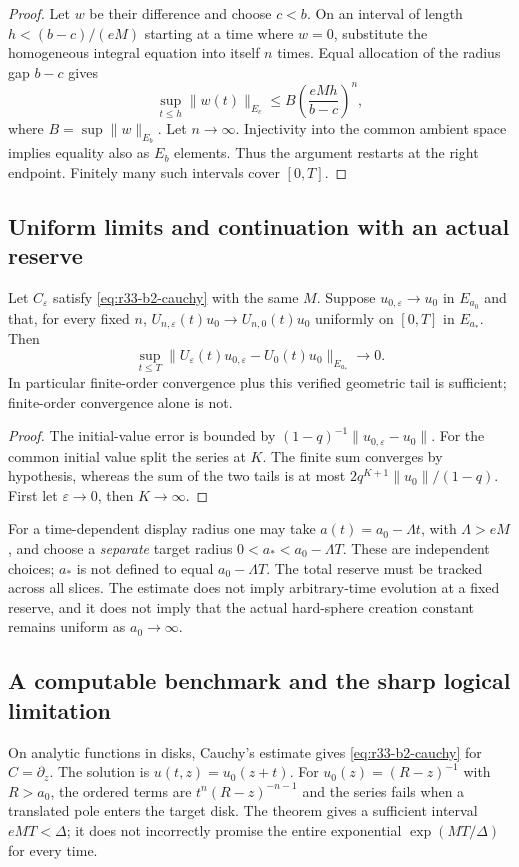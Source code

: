 \begin{proof}
Let $w$ be their difference and choose $c<b$. On an interval of length $h<(b-c)/(eM)$ starting at a time where $w=0$, substitute the homogeneous integral equation into itself $n$ times. Equal allocation of the radius gap $b-c$ gives
\[
 \sup_{t\le h}\|w(t)\|_{E_c}
 \le B\left(\frac{eMh}{b-c}\right)^n,
\]
where $B=\sup\|w\|_{E_b}$. Let $n\to\infty$. Injectivity into the common ambient space implies equality also as $E_b$ elements. Thus the argument restarts at the right endpoint. Finitely many such intervals cover $[0,T]$.
\end{proof}

\subsection{Uniform limits and continuation with an actual reserve}
\begin{theorem}
\label{thm:r33-b2-stability}
Let $C_\varepsilon$ satisfy \eqref{eq:r33-b2-cauchy} with the same $M$. Suppose $u_{0,\varepsilon}\to u_0$ in $E_{a_0}$ and that, for every fixed $n$, $U_{n,\varepsilon}(t)u_0\to U_{n,0}(t)u_0$ uniformly on $[0,T]$ in $E_{a_*}$. Then
\[
 \sup_{t\le T}\|U_\varepsilon(t)u_{0,\varepsilon}-U_0(t)u_0\|_{E_{a_*}}\longrightarrow0.
\]
In particular finite-order convergence plus this verified geometric tail is sufficient; finite-order convergence alone is not.
\end{theorem}

\begin{proof}
The initial-value error is bounded by $(1-q)^{-1}\|u_{0,\varepsilon}-u_0\|$. For the common initial value split the series at $K$. The finite sum converges by hypothesis, whereas the sum of the two tails is at most $2q^{K+1}\|u_0\|/(1-q)$. First let $\varepsilon\to0$, then $K\to\infty$.
\end{proof}

For a time-dependent display radius one may take $a(t)=a_0-\Lambda t$, with $\Lambda>eM$, and choose a \emph{separate} target radius $0<a_*<a_0-\Lambda T$. These are independent choices; $a_*$ is not defined to equal $a_0-\Lambda T$. The total reserve must be tracked across all slices. The estimate does not imply arbitrary-time evolution at a fixed reserve, and it does not imply that the actual hard-sphere creation constant remains uniform as $a_0\to\infty$.

\subsection{A computable benchmark and the sharp logical limitation}
On analytic functions in disks, Cauchy's estimate gives \eqref{eq:r33-b2-cauchy} for $C=\partial_z$. The solution is $u(t,z)=u_0(z+t)$. For $u_0(z)=(R-z)^{-1}$ with $R>a_0$, the ordered terms are $t^n(R-z)^{-n-1}$ and the series fails when a translated pole enters the target disk. The theorem gives a sufficient interval $eMT<\Delta$; it does not incorrectly promise the entire exponential $\exp(MT/\Delta)$ for every time.

